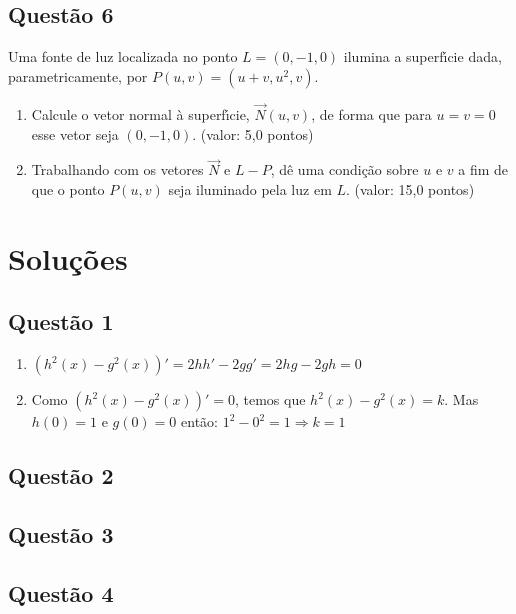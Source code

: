 \documentclass{report}
\begin{document}
\subsection{\color{blue} Quest\~ao 6}

Uma fonte de luz localizada no ponto $L = (0,-1, 0)$ ilumina a superf\'\i cie dada, parametricamente, por $P(u,v) = (u + v, u^2, v)$.

\begin{enumerate}

\item[(a)] Calcule o vetor normal \`a superf\'\i cie, $\vec N (u,v)$, de forma que para $u = v = 0$ esse vetor seja $(0,-1, 0)$. (valor: 5,0 pontos)

\item[(b)] Trabalhando com os vetores $\vec N$ e $L-P$, d\^e uma condi\c c\~ao sobre $u$ e $v$ a fim de que o ponto $P(u,v)$ seja iluminado pela luz em $L$. (valor: 15,0 pontos)

\end{enumerate}

\section{\color{red} Solu\c c\~oes}

\subsection{\color{red} Quest\~ao 1}

\begin{enumerate}

\item[(a)] $(h^2(x)-g^2(x))'=2hh'-2gg'=2hg-2gh=0$

\item[(b)] Como $(h^2(x)-g^2(x))'=0$, temos que $h^2(x)-g^2(x)=k$. Mas $h(0)=1$ e $g(0)=0$ ent\~ao: $1^2-0^2=1\Longrightarrow k=1$

\end{enumerate}

\subsection{\color{red} Quest\~ao 2}

\subsection{\color{red} Quest\~ao 3}

\subsection{\color{red} Quest\~ao 4}
\end{document}
